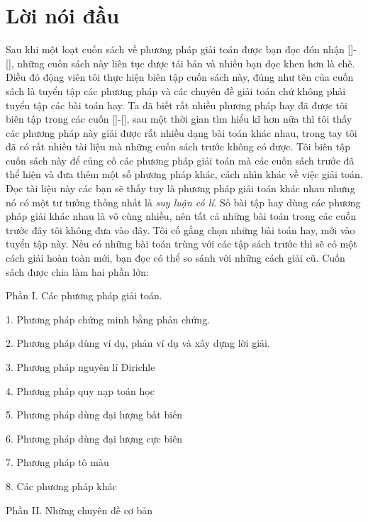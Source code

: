 \chapter*{Lời nói đầu}

\thispagestyle{empty}


\vspace*{-0.2cm}

Sau khi một loạt cuốn sách về phương pháp giải toán được bạn đọc đón nhận []-[], những cuốn sách này liên tục được tái bản và nhiều bạn đọc khen hơn là chê. Điều đó động viên tôi thực hiện biên tập cuốn sách này, đúng như tên của cuốn sách là tuyển tập các phương pháp và các chuyên đề giải toán chứ không phải tuyển tập các bài toán hay. Ta đã biết rất nhiều phương pháp hay đã được tôi biên tập trong các cuốn []-[], sau một thời gian tìm hiểu kĩ hơn nữa thì tôi thấy các phương pháp này giải được rất nhiều dạng bài toán khác nhau, trong tay tôi đã có rất nhiều tài liệu mà những cuốn sách trước không có được. Tôi biên tập cuốn sách này để củng cố các phương pháp giải toán mà các cuốn sách trước đã thể hiện và đưa thêm một số phương pháp khác, cách nhìn khác về việc giải toán. Đọc tài liệu này các bạn sẽ thấy tuy là phương pháp giải toán khác nhau nhưng nó có một tư tưởng thống nhất là {\it suy luận có lí}. Số bài tập hay dùng các phương pháp giải khác nhau là vô cùng nhiều, nên tất cả những bài toán trong các cuốn trước đây tôi không đưa vào đây. Tôi cố gắng chọn những bài toán hay, mới vào tuyển tập này. Nếu có những bài toán trùng với các tập sách trước thì sẽ có một cách giải hoàn toàn mới, bạn đọc có thể so sánh với những cách giải cũ. Cuốn sách được chia làm hai phần lớn:

Phần I. Các phương pháp giải toán.

1. Phương pháp chứng minh bằng phản chứng.

2. Phương pháp dùng ví dụ, phản ví dụ và xây dựng lời giải.

3. Phương pháp nguyên lí Đirichle

4. Phương pháp quy nạp toán học 

5. Phương pháp dùng đại lượng bất biến

6. Phương pháp dùng đại lượng cực biên

7. Phương pháp tô màu

8. Các phương pháp khác

Phần II. Những chuyên đề cơ bản

